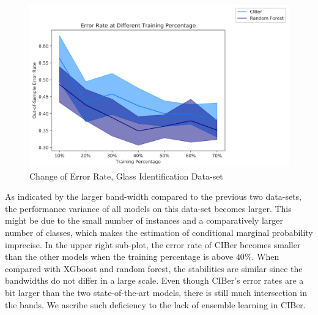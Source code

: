 \documentclass[twoside,11pt]{article}
\begin{document}
\begin{figure}[ht]
\begin{minipage}[b]{0.5\linewidth}
  \end{minipage}
  \begin{minipage}[b]{0.5\linewidth}
    \centering
    \includegraphics[width=0.9\linewidth]{Figures/Empirical/err_change_glass_rf.png}
  \end{minipage} 
  \caption{Change of Error Rate, Glass Identification Data-set} 
  \label{Fig_glass}
\end{figure}

As indicated by the larger band-width compared to the previous two data-sets, the performance variance of all models on this data-set becomes larger. This might be due to the small number of instances and a comparatively larger number of classes, which makes the estimation of conditional marginal probability imprecise. In the upper right sub-plot, the error rate of CIBer becomes smaller than the other models when the training percentage is above $40\%$. When compared with XGboost and random forest, the stabilities are similar since the bandwidths do not differ in a large scale. Even though CIBer's error rates are a bit larger than the two state-of-the-art models, there is still much intersection in the bands. We ascribe such deficiency to the lack of ensemble learning in CIBer. 
\end{document}
